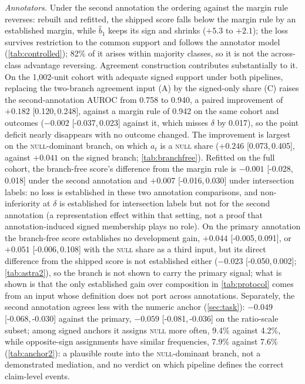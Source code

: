 \documentclass[11pt]{article}
\newcommand{\ci}[2]{[#1,\,#2]}
\begin{document}
\emph{Annotators.} Under the second annotation the ordering against the margin rule reverses:
rebuilt and refitted, the shipped score falls below the margin rule by an established margin, while
$\hat b_1$ keeps its sign and shrinks ($+5.3$ to $+2.1$); the loss survives restriction to the
common support and follows the annotator model (\cref{tab:controlled}); 82\% of it arises within
majority classes, so it is not the across-class advantage reversing. Agreement construction
contributes substantially to it. On the
1{,}002-unit cohort with adequate signed support under both pipelines, replacing the two-branch
agreement input (A) by the signed-only share (C) raises the second-annotation AUROC from 0.758 to
0.940, a paired improvement of $+0.182$ \ci{0.120}{0.248}, against a margin rule of 0.942 on the
same cohort and outcomes ($-0.002$ \ci{-0.037}{0.023} against it, which misses $\delta$ by 0.017),
so the point deficit nearly disappears with no outcome changed. The
improvement is largest on the \textsc{null}-dominant branch, on which $a_t$ is a \textsc{null}
share ($+0.246$ \ci{0.073}{0.405}, against $+0.041$ on the signed branch; \cref{tab:branchfree}).
Refitted on the full cohort, the branch-free
score's difference from the margin rule is $-0.001$ \ci{-0.028}{0.018} under the second annotation
and $+0.007$ \ci{-0.016}{0.030} under intersection labels: no loss is established in these two
annotation comparisons, and non-inferiority at $\delta$ is established for intersection labels but
not for the second annotation (a representation effect within that setting, not a proof that
annotation-induced signed membership plays no role). On the primary annotation the branch-free score establishes no
development gain, $+0.044$ \ci{-0.005}{0.091}, or $+0.051$ \ci{-0.006}{0.108} with the
\textsc{null} share as a third input, but its direct difference from the shipped score is not
established either ($-0.023$ \ci{-0.050}{0.002}; \cref{tab:astra2}), so the branch is not shown to
carry the primary signal; what is shown is that the only established gain over composition in
\cref{tab:protocol} comes from an input whose definition does not port across annotations.
Separately, the second annotation agrees less with the numeric anchor (\cref{sec:task}): $-0.049$
\ci{-0.068}{-0.030} against the primary, $-0.059$ \ci{-0.081}{-0.036} on the ratio-scale subset;
among signed anchors it assigns \textsc{null} more often, 9.4\% against 4.2\%, while opposite-sign
assignments have similar frequencies, 7.9\% against 7.6\% (\cref{tab:anchor2}): a plausible
route into the \textsc{null}-dominant branch, not a demonstrated mediation, and no verdict on
which pipeline defines the correct claim-level events.
\end{document}
